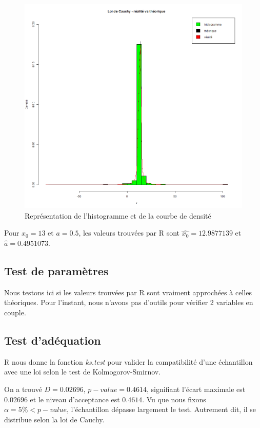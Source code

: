 \documentclass[12pt,a4paper,titlepage]{article}
\numberwithin{equation}{section}
\begin{document}
\begin{figure}[h]
\includegraphics[width=\linewidth]{images/Cauchy_real_vs_theo.png}
\caption{Représentation de l'histogramme et de la courbe de densité}
\end{figure}

Pour $x_0=13$ et $a=0.5$, les valeurs trouvées par R sont $\hat{x_0} = 12.9877139$ et $\hat{a} = 0.4951073$.

\subsection{Test de paramètres}

Nous testons ici si les valeurs trouvées par R sont vraiment approchées à celles théoriques. Pour l'instant, nous n'avons pas d'outils pour vérifier 2 variables en couple.

\subsection{Test d'adéquation}

R nous donne la fonction \emph{ks.test} pour valider la compatibilité d'une échantillon avec une loi selon le test de Kolmogorov-Smirnov.



On a trouvé $D = 0.02696$, $p-value = 0.4614$, signifiant l'écart maximale est $0.02696$ et le niveau d'acceptance est $0.4614$. Vu que nous fixons $\alpha = 5\% < p-value$, l'échantillon dépasse largement le test. Autrement dit, il se distribue selon la loi de Cauchy.
\end{document}
